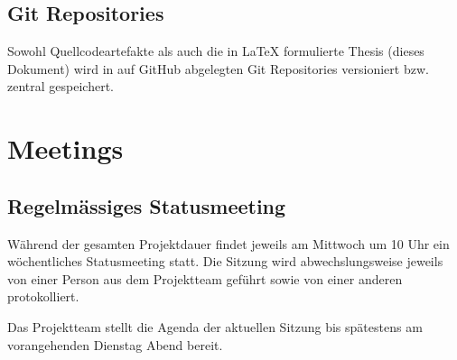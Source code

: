 \subsection{Git Repositories}
Sowohl Quellcodeartefakte als auch die in LaTeX formulierte Thesis (dieses Dokument) wird in auf GitHub abgelegten Git Repositories versioniert bzw. zentral gespeichert.



\section{Meetings}
\subsection{Regelmässiges Statusmeeting}
Während der gesamten Projektdauer findet jeweils am Mittwoch um 10 Uhr ein wöchentliches Statusmeeting statt. Die Sitzung wird abwechslungsweise jeweils von einer Person aus dem Projektteam geführt sowie von einer anderen protokolliert.

Das Projektteam stellt die Agenda der aktuellen Sitzung bis spätestens am vorangehenden Dienstag Abend bereit.